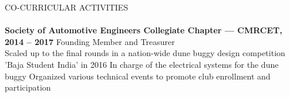 \documentclass[a4paper]{article}
\newcommand{\lineunder} {
    \vspace*{-8pt} \\
    \hspace*{-18pt} \hrulefill \\
}
\newcommand{\header} [1] {
    {\hspace*{-18pt}\vspace*{6pt} \textsc{#1}}
    \vspace*{-6pt} \lineunder
}
\begin{document}
\header{CO-CURRICULAR ACTIVITIES}
\textbf{Society of Automotive Engineers Collegiate Chapter — CMRCET, 2014 – 2017} \hfill Founding Member and Treasurer\\
Scaled up to the final rounds in a nation-wide dune buggy design competition ’Baja Student India’ in 2016 In charge of the electrical systems for the dune buggy Organized various technical events to promote club enrollment and participation\\
\vspace*{2mm}

\ 
\end{document}
